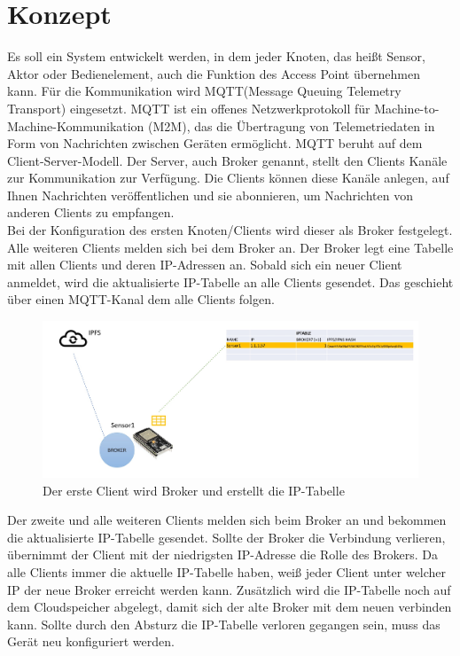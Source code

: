 \documentclass{article}
\begin{document}
\section{Konzept}
Es soll ein System entwickelt werden, in dem jeder Knoten, das heißt Sensor, Aktor oder Bedienelement, auch die Funktion des Access Point übernehmen kann. Für die Kommunikation wird MQTT(Message Queuing Telemetry Transport) eingesetzt. MQTT ist ein offenes Netzwerkprotokoll für Machine-to-Machine-Kommunikation (M2M), das die Übertragung von Telemetriedaten in Form von Nachrichten zwischen Geräten ermöglicht.
MQTT beruht auf dem Client-Server-Modell. Der Server, auch Broker genannt, stellt den Clients Kanäle zur Kommunikation zur Verfügung. Die Clients können diese Kanäle anlegen, auf Ihnen Nachrichten veröffentlichen und sie abonnieren, um Nachrichten von anderen Clients zu empfangen. 
\\

Bei der Konfiguration des ersten Knoten/Clients wird dieser als Broker festgelegt. Alle weiteren Clients melden sich bei dem Broker an. Der Broker legt eine Tabelle mit allen Clients und deren IP-Adressen an. Sobald sich ein neuer Client anmeldet, wird die aktualisierte IP-Tabelle an alle Clients gesendet. Das geschieht über einen MQTT-Kanal dem alle Clients folgen.

\begin{figure}[h]
    \centering
    \includegraphics[width=1\linewidth]{Porposal/bild1.jpg}
    \caption{Der erste Client wird Broker und erstellt die IP-Tabelle}
    \label{fig:statemachine}
\end{figure}

Der zweite und alle weiteren Clients melden sich beim Broker an und bekommen die aktualisierte IP-Tabelle gesendet. Sollte der Broker die Verbindung verlieren, übernimmt der Client mit der niedrigsten IP-Adresse die Rolle des Brokers. Da alle Clients immer die aktuelle IP-Tabelle haben, weiß jeder Client unter welcher IP der neue Broker erreicht werden kann. Zusätzlich wird die IP-Tabelle noch auf dem Cloudspeicher abgelegt, damit sich der alte Broker mit dem neuen verbinden kann. Sollte durch den Absturz die IP-Tabelle verloren gegangen sein, muss das Gerät neu konfiguriert werden.
\end{document}
